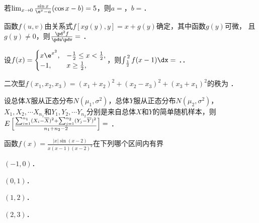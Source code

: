 \documentclass[plain,noanswer,medmath]{../../template/jnuexam}
\begin{document}





\begin{problem}
若$\lim_{x \to 0}\frac{\sin x}{\e^x - a}(\cos x - b)=5$，则$a=$\fillin{}，$b=$\fillin{}．
\end{problem}


\begin{problem}
函数$f(u,v)$由关系式$f[xg(y),y] = x + g(y)$确定，其中函数$g(y)$可微，
且$g(y) \ne 0$，则$\frac{\pd^2 f}{\pdu\pdv}=$ \fillin{}．
\end{problem}


\begin{problem}
设$f(x) = \begin{cases}
  x\e^{x^2}, & -\frac{1}{2} \le x < \frac{1}{2}, \\
         -1, & x \ge \frac{1}{2},
\end{cases}$，则$\int_{\,\frac{1}{2}}^{\,2} f(x - 1)\dx =$      ．．
\end{problem}


\begin{problem}
二次型$f(x_1,x_2,x_3) = (x_1 + x_2)^2 + (x_2 - x_3)^2 + (x_3 + x_1)^2$的秩为 \fillin{}．
\end{problem}




\begin{problem}
设总体$X$服从正态分布$N(\mu_1,\sigma^2)$，总体$Y$服从正态分布$N(\mu_2,\sigma^2)$，
$X_1,X_2, \cdots X_{n_1}$和$Y_1,Y_2, \cdots Y_{n_2}$分别是来自总体$X$和$Y$的简单随机样本，则\goodbreak
$E\left[\vcenter{\hbox{$\frac{\sum_{i = 1}^{n_1} (X_i - \overline{X})^2 
 + \sum_{j = 1}^{n_2} (Y_j - \overline{Y})^2}{n_1 + n_2 - 2}$}}\right] =$ \fillin{}．
\end{problem}




\begin{problem}
函数$f(x) = \frac{|x|\sin(x - 2)}{x(x - 1)(x - 2)^2}$在下列哪个区间内有界\pickout{}
\begin{abcd}
\item $(- 1,0)$．
\item $(0,1)$．
\item $(1,2)$．
\item $(2,3)$．
\end{abcd}
\end{problem}
\end{document}

